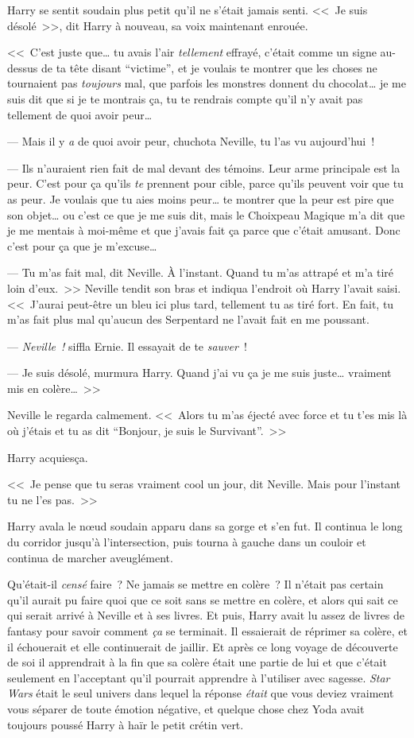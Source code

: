 Harry se sentit soudain plus petit qu'il ne s'était jamais senti. <<~Je suis désolé~>>, dit Harry à nouveau, sa voix maintenant enrouée.

<<~C'est juste que… tu avais l'air \emph{tellement} effrayé, c'était comme un signe au-dessus de ta tête disant “victime”, et je voulais te montrer que les choses ne tournaient pas \emph{toujours} mal, que parfois les monstres donnent du chocolat… je me suis dit que si je te montrais ça, tu te rendrais compte qu'il n'y avait pas tellement de quoi avoir peur…

--- Mais il y \emph{a} de quoi avoir peur, chuchota Neville, tu l'as vu aujourd'hui~!

--- Ils n'auraient rien fait de mal devant des témoins. Leur arme principale est la peur. C'est pour ça qu'ils \emph{te} prennent pour cible, parce qu'ils peuvent voir que tu as peur. Je voulais que tu aies moins peur… te montrer que la peur est pire que son objet… ou c'est ce que je me suis dit, mais le Choixpeau Magique m'a dit que je me mentais à moi-même et que j'avais fait ça parce que c'était amusant. Donc c'est pour ça que je m'excuse…

--- Tu m'as fait mal, dit Neville. À l'instant. Quand tu m'as attrapé et m'a tiré loin d'eux.~>> Neville tendit son bras et indiqua l'endroit où Harry l'avait saisi. <<~J'aurai peut-être un bleu ici plus tard, tellement tu as tiré fort. En fait, tu m'as fait plus mal qu'aucun des Serpentard ne l'avait fait en me poussant.

--- \emph{Neville~!} siffla Ernie. Il essayait de te \emph{sauver}~!

--- Je suis désolé, murmura Harry. Quand j'ai vu ça je me suis juste… vraiment mis en colère…~>>

Neville le regarda calmement. <<~Alors tu m'as éjecté avec force et tu t'es mis là où j'étais et tu as dit “Bonjour, je suis le Survivant”.~>>

Harry acquiesça.

<<~Je pense que tu seras vraiment cool un jour, dit Neville. Mais pour l'instant tu ne l'es pas.~>>

Harry avala le nœud soudain apparu dans sa gorge et s'en fut. Il continua le long du corridor jusqu'à l'intersection, puis tourna à gauche dans un couloir et continua de marcher aveuglément.

Qu'était-il \emph{censé} faire~? Ne jamais se mettre en colère~? Il n'était pas certain qu'il aurait pu faire quoi que ce soit sans se mettre en colère, et alors qui sait ce qui serait arrivé à Neville et à ses livres. Et puis, Harry avait lu assez de livres de fantasy pour savoir comment \emph{ça} se terminait. Il essaierait de réprimer sa colère, et il échouerait et elle continuerait de jaillir. Et après ce long voyage de découverte de soi il apprendrait à la fin que sa colère était une partie de lui et que c'était seulement en l'acceptant qu'il pourrait apprendre à l'utiliser avec sagesse. \emph{Star Wars} était le seul univers dans lequel la réponse \emph{était} que vous deviez vraiment vous séparer de toute émotion négative, et quelque chose chez Yoda avait toujours poussé Harry à haïr le petit crétin vert.


